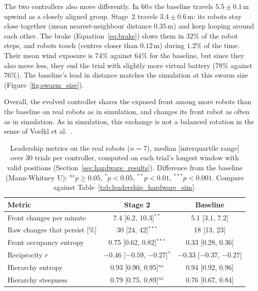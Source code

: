 \documentclass[runningheads]{llncs}
\begin{document}
The two controllers also move differently. In 60\,s the baseline travels $5.5 \pm 0.1$\,m upwind as a closely aligned group. Stage~2 travels $3.4 \pm 0.6$\,m: its robots stay close together (mean nearest-neighbour distance $0.35$\,m) and keep looping around each other. The brake (Equation~\ref{eq:brake}) slows them in $32\%$ of the robot steps, and robots touch (centres closer than $0.12$\,m) during $1.2\%$ of the time. Their mean wind exposure is $74\%$ against $64\%$ for the baseline, but since they also move less, they end the trial with slightly more virtual battery ($78\%$ against $76\%$). The baseline's lead in distance matches the simulation at this swarm size (Figure~\ref{fig:swarm_size}).

Overall, the evolved controller shares the exposed front among more robots than the baseline on real robots as in simulation, and changes its front robot as often as in simulation. As in simulation, this exchange is not a balanced rotation in the sense of Voelkl et al.~\cite{voelkl2015}.

\begin{table}[t]
\centering
\caption{Leadership metrics on the real robots ($n=7$), median [interquartile range] over 30 trials per controller, computed on each trial's longest window with valid positions (Section~\ref{sec:hardware_results}). Difference from the baseline (Mann-Whitney U): $^{ns}p\geq0.05$, $^{*}p<0.05$, $^{**}p<0.01$, $^{***}p<0.001$. Compare against Table~\ref{tab:leadership_hardware_sim}.}
\label{tab:leadership_hardware_hw}
\small
\begin{tabular}{lcc}
\toprule
\textbf{Metric} & \textbf{Stage 2} & \textbf{Baseline} \\
\midrule
Front changes per minute & 7.4 [6.2, 10.3]$^{**}$ & 5.1 [3.1, 7.2] \\
Raw changes that persist [\%] & 30 [24, 42]$^{***}$ & 18 [13, 23] \\
Front occupancy entropy & 0.75 [0.62, 0.82]$^{***}$ & 0.33 [0.28, 0.36] \\
Reciprocity $r$ & $-0.46$ [$-0.59$, $-0.27$]$^{*}$ & $-0.33$ [$-0.37$, $-0.27$] \\
Hierarchy entropy & 0.93 [0.90, 0.95]$^{ns}$ & 0.94 [0.92, 0.96] \\
Hierarchy steepness & 0.79 [0.75, 0.89]$^{ns}$ & 0.76 [0.67, 0.84] \\
\bottomrule
\end{tabular}
\end{table}
\end{document}
